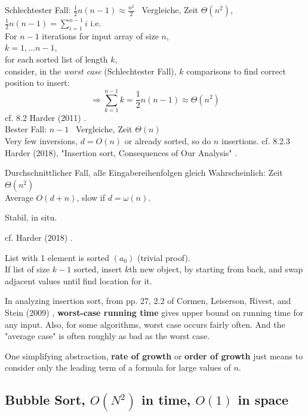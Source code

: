 \documentclass[10pt]{amsart}
\begin{document}
Schlechtester Fall: $\frac{1}{2}n(n-1) \approx \frac{n^2}{2}$ \quad \, Vergleiche, Zeit $\Theta(n^2)$, \\
$\frac{1}{2} n (n-1) = \sum_{i=1}^{n-1} i $ i.e. \\

For $n-1$ iterations for input array of size $n$, \\
$k = 1, \dots n-1$, \\
for each sorted list of length $k$, \\
consider, in the \emph{worst case} (Schlechtester Fall), $k$ comparisons to find correct position to insert: 
\[
\Longrightarrow \sum_{k=1}^{n-1} k = \frac{1}{2} n ( n -1) \approx \Theta(n^2)
\]cf. 8.2 Harder (2011) \cite{Hard2018}. \\


Bester Fall: $n-1$ \, Vergleiche, Zeit $\Theta(n)$ \\ Very few inversions, $d= O(n)$ or already sorted, so do $n$ insertions. cf. 8.2.3 Harder (2018), "Insertion sort, Consequences of Our Analysis" \cite{Hard2018}. 

Durchschnittlicher Fall, alle Eingabereihenfolgen gleich Wahrscheinlich: Zeit $\Theta(n^2)$ \\

Average $O(d+n)$, slow if $d= \omega(n)$.

Stabil, in situ.

cf. Harder (2018) \cite{Hard2018}.

List with 1 element is sorted $(a_0)$ (trivial proof). \\

If list of size $k-1$ sorted, insert $k$th new object, by starting from back, and swap adjacent values until find location for it.

In analyzing insertion sort, from pp. 27, 2.2 of Cormen, Leiserson, Rivest, and Stein (2009) \cite{CLRS2009}, \textbf{worst-case running time} gives upper bound on running time for any input. Also, for some algorithms, worst case occurs fairly often. And the "average case" is often roughly as bad as the worst case.

One simplifying abstraction, \textbf{rate of growth} or \textbf{order of growth} just means to consider only the leading term of a formula for large values of $n$.



\subsection{Bubble Sort, $O(N^2)$ in time, $O(1)$ in space}
\end{document}
